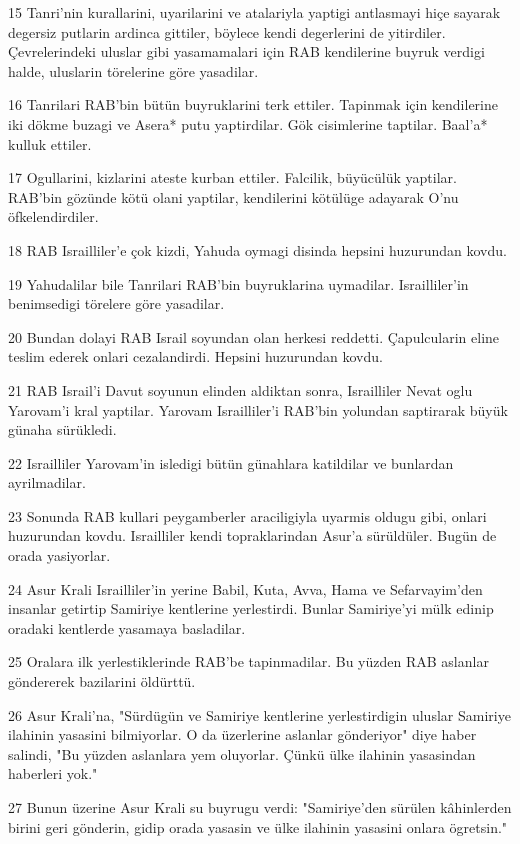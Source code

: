 \par 15 Tanri'nin kurallarini, uyarilarini ve atalariyla yaptigi antlasmayi hiçe sayarak degersiz putlarin ardinca gittiler, böylece kendi degerlerini de yitirdiler. Çevrelerindeki uluslar gibi yasamamalari için RAB kendilerine buyruk verdigi halde, uluslarin törelerine göre yasadilar.
\par 16 Tanrilari RAB'bin bütün buyruklarini terk ettiler. Tapinmak için kendilerine iki dökme buzagi ve Asera* putu yaptirdilar. Gök cisimlerine taptilar. Baal'a* kulluk ettiler.
\par 17 Ogullarini, kizlarini ateste kurban ettiler. Falcilik, büyücülük yaptilar. RAB'bin gözünde kötü olani yaptilar, kendilerini kötülüge adayarak O'nu öfkelendirdiler.
\par 18 RAB Israilliler'e çok kizdi, Yahuda oymagi disinda hepsini huzurundan kovdu.
\par 19 Yahudalilar bile Tanrilari RAB'bin buyruklarina uymadilar. Israilliler'in benimsedigi törelere göre yasadilar.
\par 20 Bundan dolayi RAB Israil soyundan olan herkesi reddetti. Çapulcularin eline teslim ederek onlari cezalandirdi. Hepsini huzurundan kovdu.
\par 21 RAB Israil'i Davut soyunun elinden aldiktan sonra, Israilliler Nevat oglu Yarovam'i kral yaptilar. Yarovam Israilliler'i RAB'bin yolundan saptirarak büyük günaha sürükledi.
\par 22 Israilliler Yarovam'in isledigi bütün günahlara katildilar ve bunlardan ayrilmadilar.
\par 23 Sonunda RAB kullari peygamberler araciligiyla uyarmis oldugu gibi, onlari huzurundan kovdu. Israilliler kendi topraklarindan Asur'a sürüldüler. Bugün de orada yasiyorlar.
\par 24 Asur Krali Israilliler'in yerine Babil, Kuta, Avva, Hama ve Sefarvayim'den insanlar getirtip Samiriye kentlerine yerlestirdi. Bunlar Samiriye'yi mülk edinip oradaki kentlerde yasamaya basladilar.
\par 25 Oralara ilk yerlestiklerinde RAB'be tapinmadilar. Bu yüzden RAB aslanlar göndererek bazilarini öldürttü.
\par 26 Asur Krali'na, "Sürdügün ve Samiriye kentlerine yerlestirdigin uluslar Samiriye ilahinin yasasini bilmiyorlar. O da üzerlerine aslanlar gönderiyor" diye haber salindi, "Bu yüzden aslanlara yem oluyorlar. Çünkü ülke ilahinin yasasindan haberleri yok."
\par 27 Bunun üzerine Asur Krali su buyrugu verdi: "Samiriye'den sürülen kâhinlerden birini geri gönderin, gidip orada yasasin ve ülke ilahinin yasasini onlara ögretsin."
